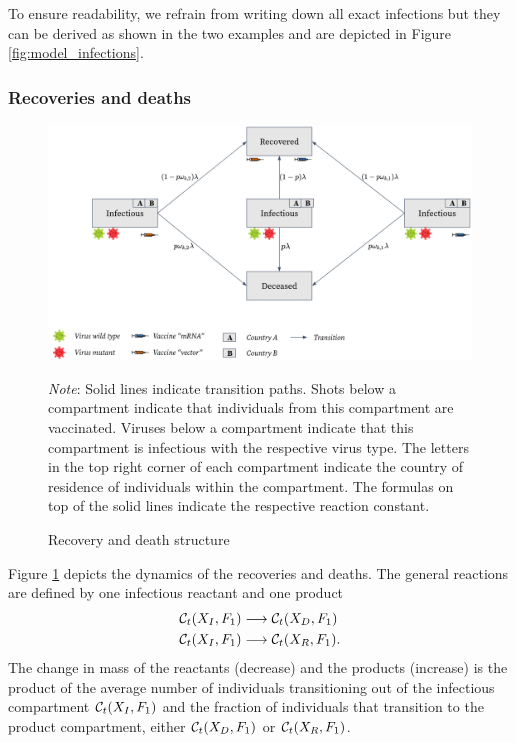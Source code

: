 To ensure readability, we refrain from writing down all exact infections but they can be derived as shown in the two examples and are depicted in Figure \ref{fig:model_infections}.

\subsubsection{Recoveries and deaths}
\begin{figure}[h!]
\centering
\includegraphics[scale=0.3]{images/overview_recovery.png}\\
\begin{flushleft}
\scriptsize{\textit{Note}: Solid lines indicate transition paths. Shots below a compartment indicate that individuals from this compartment are vaccinated. Viruses below a compartment indicate that this compartment is infectious with the respective virus type. The letters in the top right corner of each compartment indicate the country of residence of individuals within the compartment. The formulas on top of the solid lines indicate the respective reaction constant.}
\end{flushleft}
\caption{Recovery and death structure}
\label{fig:model_recoveries}
\end{figure}
Figure \ref{fig:model_recoveries} depicts the dynamics of the recoveries and deaths. The general reactions are defined by one infectious reactant and one product
\begin{align}
\label{eq:recovery}
    \mathcal{C}_t(X_I, F_1) & \longrightarrow  \mathcal{C}_t(X_D, F_1) \\
    \mathcal{C}_t(X_I, F_1) & \longrightarrow  \mathcal{C}_t(X_R, F_1). \notag
\end{align}
The change in mass of the reactants (decrease) and the products (increase) is the product of the average number of individuals transitioning out of the infectious compartment $\mathcal{C}_t(X_I, F_1)$ and the fraction of individuals that transition to the product compartment, either $\mathcal{C}_t(X_D, F_1)$ or $\mathcal{C}_t(X_R, F_1)$. \\

